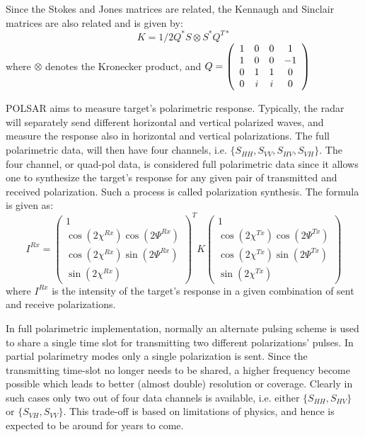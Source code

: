 Since the Stokes and Jones matrices are related, the Kennaugh and Sinclair matrices are also related and is given by:
\begin{equation}
K = 1/2 Q^* S \otimes S^* Q^{T*}
\end{equation}
where
	$\otimes$ denotes the Kronecker product, and
	$Q = 
\left( 
\begin{array}{c c c c}
 1 & 0 & 0 &  1 \\
 1 & 0 & 0 & -1\\
 0 & 1 & 1 &  0\\
 0 & i & i &  0
\end{array}
\right)$ 

POLSAR aims to measure target's polarimetric response.
Typically, the radar will separately send different horizontal and vertical polarized waves, and measure the response also in horizontal and vertical polarizations.
The full polarimetric data, will then have four channels, i.e. $\{ S_{HH}, S_{VV}, S_{HV}, S_{VH} \}$. 
The four channel, or quad-pol data, is considered full polarimetric data since it allows one to synthesize the target's response for any given pair of transmitted and received polarization.
Such a process is called polarization synthesis.
The formula is given as:
\begin{equation}
I^{Rx} = 
\left( 
\begin{array}{c }
 1 \\
 \cos(2\chi^{Rx}) \cos(2\Psi^{Rx}) \\
 \cos(2\chi^{Rx}) \sin(2\Psi^{Rx}) \\
 \sin(2\chi^{Rx}) 
\end{array}
\right)^T
K
\left( 
\begin{array}{c }
 1 \\
 \cos(2\chi^{Tx}) \cos(2\Psi^{Tx}) \\
 \cos(2\chi^{Tx}) \sin(2\Psi^{Tx}) \\
 \sin(2\chi^{Tx}) 
\end{array}
\right)
\end{equation}
where $I^{Rx}$ is the intensity of the target's response in a given combination of sent and receive polarizations.

In full polarimetric implementation, normally an alternate pulsing scheme is used to share a single time slot for transmitting two different polarizations' pulses.
In partial polarimetry modes only a single polarization is sent.
Since the transmitting time-slot no longer needs to be shared, a higher frequency become possible which leads to better (almost double) resolution or coverage.
Clearly in such cases only two out of four data channels is available, i.e. either $\{S_{HH},S_{HV}\}$ or $\{S_{VH},S_{VV}\}$.
This trade-off is based on limitations of physics, and hence is expected to be around for years to come.

